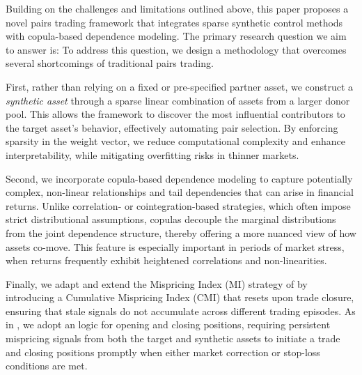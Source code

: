 
Building on the challenges and limitations outlined above, this paper proposes a novel pairs trading framework that integrates sparse synthetic control methods with copula-based dependence modeling. 
%
%
The primary research question we aim to answer is: 
%
%
To address this question, we design a methodology that overcomes several shortcomings of traditional pairs trading. 

First, rather than relying on a fixed or pre-specified partner asset, we construct a \emph{synthetic asset} through a sparse linear combination of assets from a larger donor pool. This allows the framework to discover the most influential contributors to the target asset's behavior, effectively automating pair selection. By enforcing sparsity in the weight vector, we reduce computational complexity and enhance interpretability, while mitigating overfitting risks in thinner markets.

Second, we incorporate copula-based dependence modeling to capture potentially complex, non-linear relationships and tail dependencies that can arise in financial returns. Unlike correlation- or cointegration-based strategies, which often impose strict distributional assumptions, copulas decouple the marginal distributions from the joint dependence structure, thereby offering a more nuanced view of how assets co-move. This feature is especially important in periods of market stress, when returns frequently exhibit heightened correlations and non-linearities.

Finally, we adapt and extend the Mispricing Index (MI) strategy of \cite{Xie2016} by introducing a Cumulative Mispricing Index (CMI) that resets upon trade closure, ensuring that stale signals do not accumulate across different trading episodes. As in \cite{Rad2016}, we adopt an  logic for opening and closing positions, requiring persistent mispricing signals from both the target and synthetic assets to initiate a trade and closing positions promptly when either market correction or stop-loss conditions are met.


